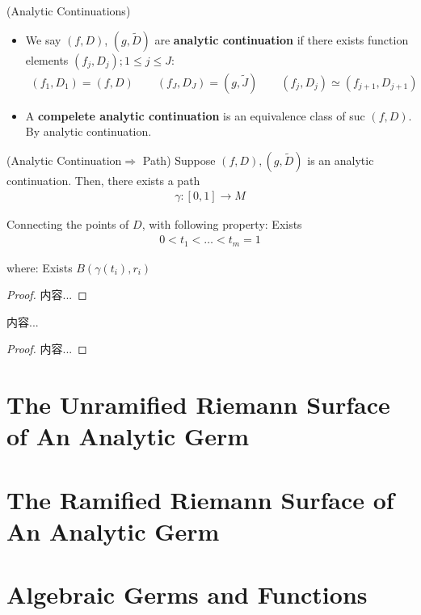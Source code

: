 \documentclass[Total.tex]{subfiles}
\begin{document}
			\begin{Def}
				(Analytic Continuations)
				\begin{itemize}
					\item We say $(f,D)$, $(g,\tilde{D})$ are \textbf{analytic continuation} if there exists function elements $(f_j,D_j);1\leq j\leq J$: 
					\begin{gather*}
						(f_1,D_1)=(f,D)\qquad (f_J,D_J)=(g,\tilde{J})\qquad (f_j,D_j)\simeq (f_{j+1},D_{j+1})
					\end{gather*}
					\item A \textbf{compelete analytic continuation} is an equivalence class of suc $(f,D)$. By analytic continuation.
				\end{itemize}
			\end{Def}
			
			\begin{lemma}
				(Analytic Continuation$\Rightarrow$ Path) Suppose $(f,D),(g,\tilde{D})$ is an analytic continuation. Then, there exists a path
				\begin{gather*}
					\gamma:[0,1]\rightarrow M
				\end{gather*}
				
				Connecting the points of $D$, with following property: Exists
				\begin{gather*}
					0<t_1<\dots<t_m=1
				\end{gather*}
				
				where: Exists $B(\gamma(t_i),r_i)$
			\end{lemma}
			\begin{proof}
				内容...
			\end{proof}
			
			\begin{corollary}
				内容...
			\end{corollary}
			\begin{proof}
				内容...
			\end{proof}
			
			\section{The Unramified Riemann Surface of An Analytic Germ}
			\section{The Ramified Riemann Surface of An Analytic Germ}
			\section{Algebraic Germs and Functions}
	
\end{document}
